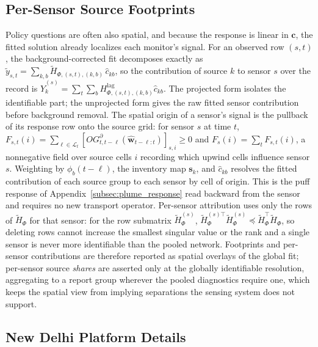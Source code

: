 \subsection{Per-Sensor Source Footprints}
\label{app:footprint_details}

Policy questions are often also spatial, and because the response is linear in
\(\mathbf c\), the fitted solution already localizes each monitor's signal.  For an
observed row \((s,t)\), the background-corrected fit decomposes exactly as
\(\widetilde y_{s,t}=\sum_{k,b}\widetilde H_{\Phi,(s,t),(k,b)}\,\widehat c_{kb}\),
so the contribution of source \(k\) to sensor \(s\) over the record is
\(\widehat Y^{(s)}_k=\sum_t\sum_b
H_{\Phi,(s,t),(k,b)}^{\mathrm{lag}}\widehat c_{kb}\).  The projected form isolates
the identifiable part; the unprojected form gives the raw fitted sensor
contribution before background removal.  The spatial origin of a sensor's signal
is the pullback of its response row onto the source grid: for sensor \(s\) at time
\(t\), \(F_{s,t}(i)=\sum_{\ell\in\mathcal L_t}
[O G_{t,t-\ell}^{\partial}(\widehat{\mathbf w}_{t-\ell:t})]_{s,i}\ge 0\) and
\(F_s(i)=\sum_t F_{s,t}(i)\), a nonnegative field over source cells \(i\)
recording which upwind cells influence sensor \(s\).  Weighting by
\(\phi_b(t-\ell)\), the inventory map \(\mathbf s_k\), and \(\widehat c_{kb}\)
resolves the fitted contribution of each source group to each sensor by cell of
origin.  This is the puff response of Appendix~\ref{subsec:plume_response} read
backward from the sensor and requires no new transport operator.  Per-sensor
attribution uses only the rows of \(\widetilde H_\Phi\) for that sensor: for the
row submatrix \(\widetilde H_\Phi^{(s)}\),
\(\widetilde H_\Phi^{(s)\top}\widetilde H_\Phi^{(s)}\preceq
\widetilde H_\Phi^\top\widetilde H_\Phi\), so deleting rows cannot increase the
smallest singular value or the rank and a single sensor is never more
identifiable than the pooled network.  Footprints and per-sensor contributions
are therefore reported as spatial overlays of the global fit; per-sensor source
\emph{shares} are asserted only at the globally identifiable resolution,
aggregating to a report group wherever the pooled diagnostics require one, which
keeps the spatial view from implying separations the sensing system does not
support.


\subsection{New Delhi Platform Details}
\label{app:platform_details}

